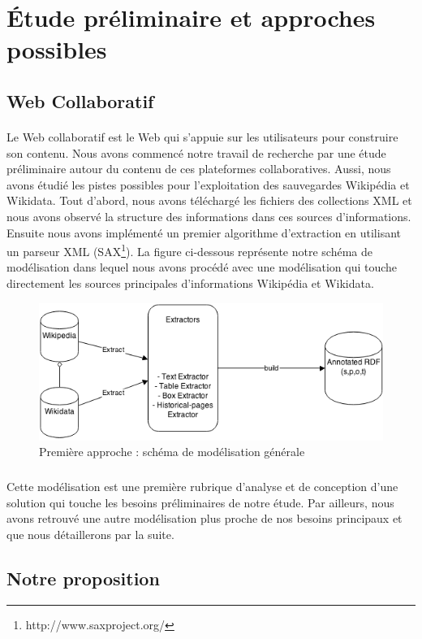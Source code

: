 \section{Étude préliminaire et approches possibles}
\subsection{Web Collaboratif}
\paragraph{}
Le Web collaboratif est le Web qui s'appuie sur les utilisateurs pour construire son contenu. Nous avons commencé notre travail de recherche par une étude préliminaire autour du contenu de ces plateformes collaboratives. Aussi, nous avons étudié les pistes possibles pour l'exploitation des sauvegardes Wikipédia et Wikidata. Tout d'abord, nous avons téléchargé les fichiers des collections XML et nous avons observé la structure des informations dans ces sources d'informations. Ensuite nous avons implémenté un premier algorithme d'extraction en utilisant un parseur XML (SAX\footnote{http://www.saxproject.org/}).
La figure ci-dessous représente notre schéma de modélisation dans lequel nous avons procédé avec une modélisation qui touche directement les sources principales d'informations Wikipédia et Wikidata.
\begin{figure}[H]
        \centering
                \centering
                \includegraphics[width=13cm]{modelisation.png}
               \caption{Première approche : schéma de modélisation générale}

\end{figure}
\subparagraph{}
Cette modélisation est une première rubrique d'analyse et de conception d'une solution qui touche les besoins préliminaires de notre étude. Par ailleurs, nous avons retrouvé une autre modélisation plus proche de nos besoins principaux et que nous détaillerons par la suite.
\subsection{Notre proposition}
